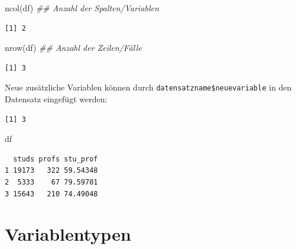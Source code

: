 \documentclass[
  letterpaper,
  DIV=11,
  numbers=noendperiod]{scrreprt}
\newenvironment{Shaded}{\begin{snugshade}}{\end{snugshade}}
\newcommand{\DocumentationTok}[1]{\textcolor[rgb]{0.37,0.37,0.37}{\textit{#1}}}
\newcommand{\FunctionTok}[1]{\textcolor[rgb]{0.28,0.35,0.67}{#1}}
\newcommand{\NormalTok}[1]{\textcolor[rgb]{0.00,0.46,0.62}{#1}}
\newcommand{\OtherTok}[1]{\textcolor[rgb]{0.00,0.46,0.62}{#1}}
\newcommand{\SpecialCharTok}[1]{\textcolor[rgb]{0.37,0.37,0.37}{#1}}
\begin{document}
\begin{Shaded}
\begin{Highlighting}[]
\FunctionTok{ncol}\NormalTok{(df) }\DocumentationTok{\#\# Anzahl der Spalten/Variablen}
\end{Highlighting}
\end{Shaded}

\begin{verbatim}
[1] 2
\end{verbatim}

\begin{Shaded}
\begin{Highlighting}[]
\FunctionTok{nrow}\NormalTok{(df) }\DocumentationTok{\#\# Anzahl der Zeilen/Fälle}
\end{Highlighting}
\end{Shaded}

\begin{verbatim}
[1] 3
\end{verbatim}

Neue zusätzliche Variablen können durch
\texttt{datensatzname\$neuevariable} in den Datensatz eingefügt werden:

\begin{Shaded}
\end{Shaded}

\begin{verbatim}
[1] 3
\end{verbatim}

\begin{Shaded}
\begin{Highlighting}[]
\NormalTok{df}
\end{Highlighting}
\end{Shaded}

\begin{verbatim}
  studs profs stu_prof
1 19173   322 59.54348
2  5333    67 79.59701
3 15643   210 74.49048
\end{verbatim}

\hypertarget{variablentypen}{%
\section{Variablentypen}\label{variablentypen}}
\end{document}

